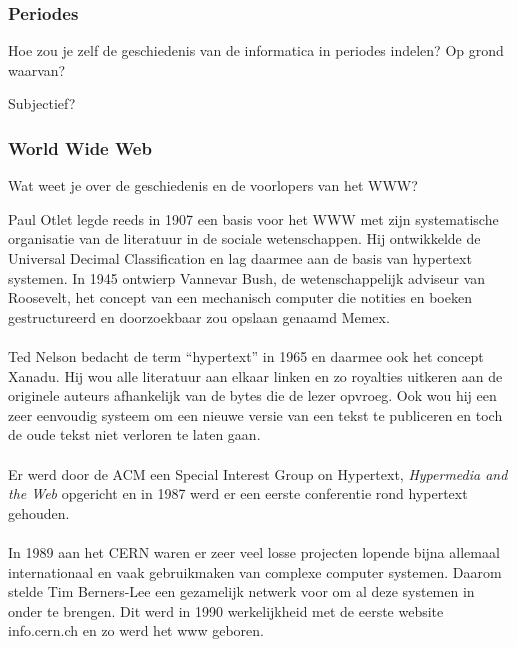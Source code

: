 \documentclass[../main.tex]{subfiles}
\begin{document}
\subsubsection{Periodes}
\begin{question}
Hoe zou je zelf de geschiedenis van de informatica in periodes indelen? Op grond waarvan?
\end{question}
\begin{solution} Subjectief?
\end{solution}

\subsubsection{World Wide Web}
\begin{question}
Wat weet je over de geschiedenis en de voorlopers van het WWW?
\end{question}
\begin{solution}
Paul Otlet legde reeds in 1907 een basis voor het WWW met zijn systematische organisatie van de literatuur in de sociale wetenschappen.
Hij ontwikkelde de Universal Decimal Classification en lag daarmee aan de basis van hypertext systemen.
In 1945 ontwierp Vannevar Bush, de wetenschappelijk adviseur van Roosevelt, het concept van een mechanisch computer die notities en boeken gestructureerd en doorzoekbaar zou opslaan genaamd Memex.
\\\\
Ted Nelson bedacht de term ``hypertext'' in 1965 en daarmee ook het concept Xanadu.
Hij wou alle literatuur aan elkaar linken en zo royalties uitkeren aan de originele auteurs afhankelijk van de bytes die de lezer opvroeg.
Ook wou hij een zeer eenvoudig systeem om een nieuwe versie van een tekst te publiceren en toch de oude tekst niet verloren te laten gaan.
\\\\
Er werd door de ACM een Special Interest Group on Hypertext, \emph{Hypermedia and the Web} opgericht en in 1987 werd er een eerste conferentie rond hypertext gehouden.
\\\\
In 1989 aan het CERN waren er zeer veel losse projecten lopende bijna allemaal internationaal en vaak gebruikmaken van complexe computer systemen.
Daarom stelde Tim Berners-Lee een gezamelijk netwerk voor om al deze systemen in onder te brengen.
Dit werd in 1990 werkelijkheid met de eerste website info.cern.ch en zo werd het www geboren.
\end{solution}
\end{document}
